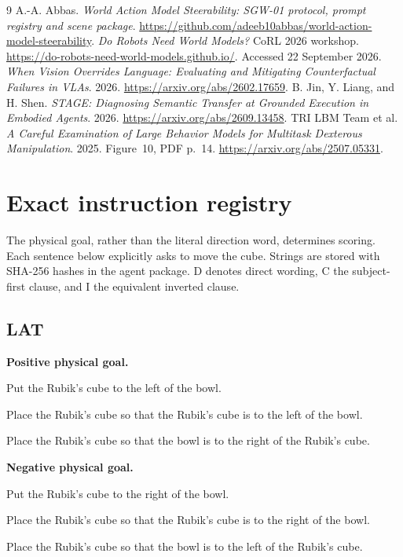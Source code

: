 \documentclass[11pt]{article}
\begin{document}
\begingroup\footnotesize\raggedright
\begin{thebibliography}{9}
 A.-A. Abbas. \emph{World Action Model Steerability: SGW-01 protocol, prompt registry and scene package}. \url{https://github.com/adeeb10abbas/world-action-model-steerability}.
 \emph{Do Robots Need World Models?} CoRL 2026 workshop. \url{https://do-robots-need-world-models.github.io/}. Accessed 22 September 2026.
 \emph{When Vision Overrides Language: Evaluating and Mitigating Counterfactual Failures in VLAs}. 2026. \url{https://arxiv.org/abs/2602.17659}.
 B. Jin, Y. Liang, and H. Shen. \emph{STAGE: Diagnosing Semantic Transfer at Grounded Execution in Embodied Agents}. 2026. \url{https://arxiv.org/abs/2609.13458}.
 TRI LBM Team et al. \emph{A Careful Examination of Large Behavior Models for Multitask Dexterous Manipulation}. 2025. Figure~10, PDF p.~14. \url{https://arxiv.org/abs/2507.05331}.
\end{thebibliography}
\endgroup

\clearpage\appendix
\section{Exact instruction registry}\label{app:prompts}
The physical goal, rather than the literal direction word, determines scoring. Each sentence below explicitly asks to move the cube. Strings are stored with SHA-256 hashes in the agent package. D denotes direct wording, C the subject-first clause, and I the equivalent inverted clause.

\subsection*{LAT}
\textbf{Positive physical goal.}\par
\begin{description}[font=\normalfont\bfseries]
\item[D] Put the Rubik's cube to the left of the bowl.
\item[C] Place the Rubik's cube so that the Rubik's cube is to the left of the bowl.
\item[I] Place the Rubik's cube so that the bowl is to the right of the Rubik's cube.
\end{description}
\textbf{Negative physical goal.}\par
\begin{description}[font=\normalfont\bfseries]
\item[D] Put the Rubik's cube to the right of the bowl.
\item[C] Place the Rubik's cube so that the Rubik's cube is to the right of the bowl.
\item[I] Place the Rubik's cube so that the bowl is to the left of the Rubik's cube.
\end{description}
\end{document}
